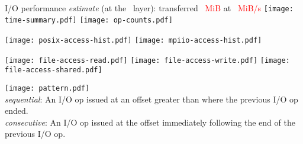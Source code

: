 \documentclass[11pt,letterpaper,twocolumn]{article}
\begin{document}
\selectfont

\pagestyle{fancy}

\ifdefined\incompletelog
{}
\newpage
\fi

\begin{figure*}[!h]
\centering
\subfigure
{
    
}\\
\vspace{1em}
I/O performance \emph{estimate} (at the \perflayer \ layer):
transferred \textcolor{red}{\perfbytes \ MiB} at \textcolor{red}{\perfest \ MiB/s}
\vspace{3em}
\subfigure
{
    \texttt{[image: time-summary.pdf]}
}
\subfigure
{
    \texttt{[image: op-counts.pdf]}
}
\end{figure*}

\begin{figure*}[!h]
\centering
\subfigure
{
    \texttt{[image: posix-access-hist.pdf]}
}
\ifdefined\inclmpiio
\subfigure
{
    \texttt{[image: mpiio-access-hist.pdf]}
}
\fi
\end{figure*}

\begin{figure*}[!h]
\centering
\subfigure
{
    
}
\subfigure
{
    
}
\end{figure*}

\begin{figure*}[!h]
\centering
\subfigure
{
    \texttt{[image: file-access-read.pdf]}
}
\subfigure
{
    \texttt{[image: file-access-write.pdf]}
}
\subfigure
{
    \texttt{[image: file-access-shared.pdf]}
}
\subfigure
{
    
}
\subfigure
{
    
}
\end{figure*}

\begin{figure*}[!h]
\centering
\subfigure
{
    \texttt{[image: pattern.pdf]}
}
\scriptsize
\\ \textit{sequential}: An I/O op issued at an offset greater than where the previous I/O op ended.
\\ \textit{consecutive}: An I/O op issued at the offset immediately following the end of the previous I/O op. \\
\normalsize
\subfigure
{
    
}
\end{figure*}
\end{document}
